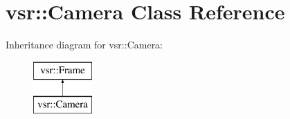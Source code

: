 \hypertarget{classvsr_1_1_camera}{\section{vsr\-:\-:Camera Class Reference}
\label{classvsr_1_1_camera}
}
Inheritance diagram for vsr\-:\-:Camera\-:\begin{figure}[H]
\begin{center}
\leavevmode
\includegraphics[height=2.000000cm]{classvsr_1_1_camera}
\end{center}
\end{figure}
